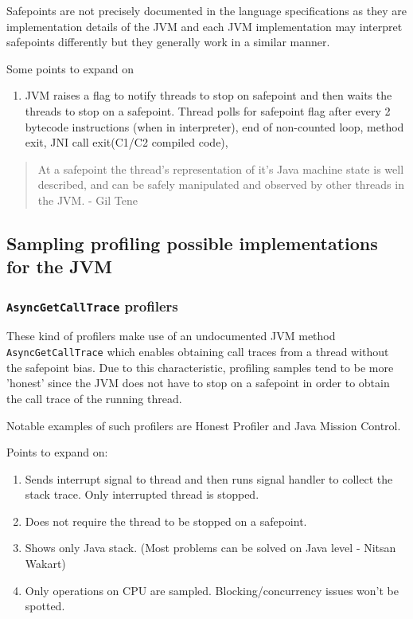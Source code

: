 \documentclass[..thesis.tex]{subfiles}
\begin{document}
Safepoints are not precisely documented in the language specifications as they are implementation details of the JVM and each JVM implementation may interpret safepoints differently but they generally work in a similar manner. 


Some points to expand on
\begin{enumerate}
	\item JVM raises a flag to notify threads to stop on safepoint and then waits the threads to stop on a safepoint. Thread polls for safepoint flag after every 2 bytecode instructions (when in interpreter), end of non-counted loop, method exit, JNI call exit(C1/C2 compiled code), 
\end{enumerate}
\begin{quote}
At a safepoint the thread's representation of it's Java machine state is well described, and can be safely manipulated and observed by other threads in the JVM. - Gil Tene
\end{quote}

\subsection{Sampling profiling possible implementations for the JVM}



\subsubsection{\texttt{AsyncGetCallTrace} profilers}
These kind of profilers make use of an undocumented JVM method \texttt{Async\-Get\-Call\-Trace} \cite{agct_source} which enables obtaining call traces from a thread without the safepoint bias. Due to this characteristic, profiling samples tend to be more 'honest' since the JVM does not have to stop on a safepoint in order to obtain the call trace of the running thread.

Notable examples of such profilers are Honest Profiler and Java Mission Control. 

Points to expand on:
\begin{enumerate}
	\item Sends interrupt signal to thread and then runs signal handler to collect the stack trace. Only interrupted thread is stopped.
	\item Does not require the thread to be stopped on a safepoint.
	\item Shows only Java stack. (Most problems can be solved on Java level - Nitsan Wakart)
	\item Only operations on CPU are sampled. Blocking/concurrency issues won't be spotted.
\end{enumerate}
\end{document}
